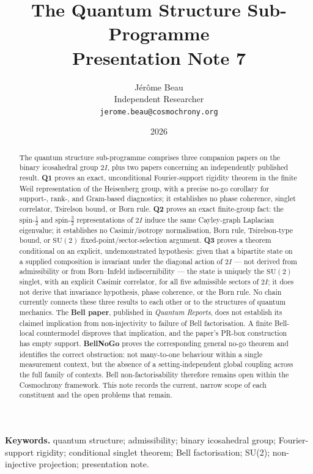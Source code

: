 \documentclass[11pt,a4paper]{article}
\title{The Quantum Structure Sub-Programme\\[0.4em]
\large Presentation Note 7}
\author{J\'{e}r\^{o}me Beau\\[0.3em]
\small Independent Researcher\\
\small \texttt{jerome.beau@cosmochrony.org}}
\date{2026}
\theoremstyle{definition}
\newcommand{\SU}{\mathrm{SU}}
\newcommand{\twoI}{2I}
\begin{document}
  \maketitle

  \begin{abstract}
    The quantum structure sub-programme comprises three companion papers on the binary
    icosahedral group $\twoI$, plus two papers concerning an independently published result.
    \textbf{Q1} proves an
    exact, unconditional Fourier-support rigidity theorem in the finite Weil representation of
    the Heisenberg group, with a precise no-go corollary for support-, rank-, and
    Gram-based diagnostics; it establishes no phase coherence, singlet correlator, Tsirelson
    bound, or Born rule. \textbf{Q2} proves an exact finite-group fact: the spin-$\tfrac12$ and
    spin-$\tfrac32$ representations of $\twoI$ induce the same Cayley-graph Laplacian
    eigenvalue; it establishes no Casimir/isotropy normalisation, Born rule, Tsirelson-type
    bound, or $\SU(2)$ fixed-point/sector-selection argument. \textbf{Q3} proves a theorem
    conditional on an explicit, undemonstrated hypothesis: given that a bipartite state on a
    supplied composition is invariant under the diagonal action of $\twoI$ --- not derived from
    admissibility or from Born--Infeld indiscernibility --- the state is uniquely the $\SU(2)$
    singlet, with an explicit Casimir correlator, for all five admissible sectors of $\twoI$; it
    does not derive that invariance hypothesis, phase coherence, or the Born rule. No chain
    currently connects these three results to each other or to the structures of quantum
    mechanics. The \textbf{Bell paper}, published in \textit{Quantum Reports}, does not establish
    its claimed implication from non-injectivity to failure of Bell factorisation. A finite
    Bell-local countermodel disproves that implication, and the paper's PR-box construction has
    empty support. \textbf{BellNoGo} proves the corresponding general no-go theorem and identifies
    the correct obstruction: not many-to-one behaviour within a single measurement context, but
    the absence of a setting-independent global coupling across the full family of contexts. Bell
    non-factorisability therefore remains open within the Cosmochrony framework. This note records
    the current, narrow scope of each constituent and the open problems that remain.
  \end{abstract}

  \medskip
  \noindent\textbf{Keywords.}
  quantum structure; admissibility; binary icosahedral group; Fourier-support rigidity;
  conditional singlet theorem; Bell factorisation; SU(2); non-injective projection;
  presentation note.
\end{document}
